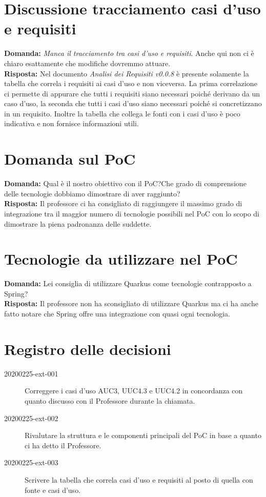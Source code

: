 \documentclass{article}
\begin{document}
\section{Discussione tracciamento casi d'uso e requisiti}%
\label{sec:discussione_tracciamento_casi_requisiti}
\textbf{Domanda:} \textit{Manca il tracciamento tra casi d'uso e requisiti}. Anche qui non ci è chiaro esattamente che modifiche dovremmo attuare.\\
\textbf{Risposta:} Nel documento \textit{Analisi dei Requisiti v0.0.8} è presente solamente la tabella che correla i requisiti ai casi d'uso e non viceversa.
La prima correlazione ci permette di appurare che tutti i requisiti siano necessari poiché derivano da un caso d'uso, la seconda che tutti i casi d'uso siano necessari poiché si concretizzano in un requisito.
Inoltre la tabella che collega le fonti con i casi d'uso è poco indicativa e non fornisce informazioni utili.

\section{Domanda sul PoC}%
\label{sec:domanda_poc}
\textbf{Domanda:} Qual è il nostro obiettivo con il PoC?\@ Che grado di comprensione delle tecnologie dobbiamo dimostrare di aver raggiunto?\\
\textbf{Risposta:} Il professore ci ha consigliato di raggiungere il massimo grado di integrazione tra il maggior numero di tecnologie possibili nel PoC con lo scopo di dimostrare la piena padronanza delle suddette.

\section{Tecnologie da utilizzare nel PoC}%
\label{sec:tecnologie_poc}
\textbf{Domanda:} Lei consiglia di utilizzare Quarkus come tecnologie contrapposto a Spring?\\
\textbf{Risposta:} Il professore non ha sconsigliato di utilizzare Quarkus ma ci ha anche fatto notare che Spring offre una integrazione con quasi ogni tecnologia.
\newpage
\section{Registro delle decisioni}%
\label{sec:registro_delle_decisioni}

\begin{description}
  \item[20200225-ext-001] Correggere i casi d'uso AUC3, UUC4.3 e UUC4.2 in concordanza con quanto discusso con il Professore durante la chiamata.
  \item[20200225-ext-002] Rivalutare la struttura e le componenti principali del PoC in base a quanto ci ha detto il Professore.
  \item[20200225-ext-003] Scrivere la tabella che correla casi d'uso e requisiti al posto di quella con fonte e casi d'uso.
\end{description}

\end{document}
